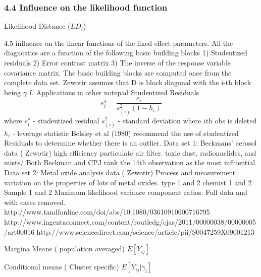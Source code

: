 \documentclass[12pt, a4paper]{article}
\begin{document}
\subsubsection*{4.4 Influence on the likelihood function}
Likelihood Distance ($LD_i$)

4.5 influence on the linear functions of the fixed effect parameters.
All the diagnostics are a function of the following basic building blocks
1)  	Studentized residuals
2)  	Error contrast matrix
3)  	The inverse of the response variable covariance matrix.
The basic building blocks are computed once from the complete data set.
Zewotir assumes that D is block diagonal with the i-th block being $\gamma. I$.
Applications in other notepad
Studentized Residuals
\[ e^s_i = \frac{e_i}{s^2_{(i)}(1-h_i)} \]
where
$e^s_i $ - studentized residual
$s^2_{(i)}$ - standard deviation where $i$th obs is deleted
$h_i$ - leverage statistic
Belsley et al (1980) recommend the use of studentized Residuals to determine whether there is an outlier.
Data set 1: Beckmans' aerosol data ( Zewotir)
high efficiency particulate air filter.
toxic dust, radionuclides, and mists/
Both Beckman and CPJ rank the 14th observation as the most influential.
Data set 2: Metal oxide analysis data ( Zewotir)
Process and measurement variation on the properties of lots of metal oxides.
type 1 and 2
chemist 1 and 2
Sample 1 and 2
Maximum likelihood variance component ratios.
Full data and with cases removed.
http://www.tandfonline.com/doi/abs/10.1080/03610910600716795
http://www.ingentaconnect.com/content/routledg/cjas/2011/00000038/00000005/art00016
http://www.sciencedirect.com/science/article/pii/S0047259X09001213



Margina Means ( population averaged)
$E[Y_{ij}]$

Conditional means ( Cluster specific)
$E[Y_{ij}|\gamma_{i}]$






\end{document}
